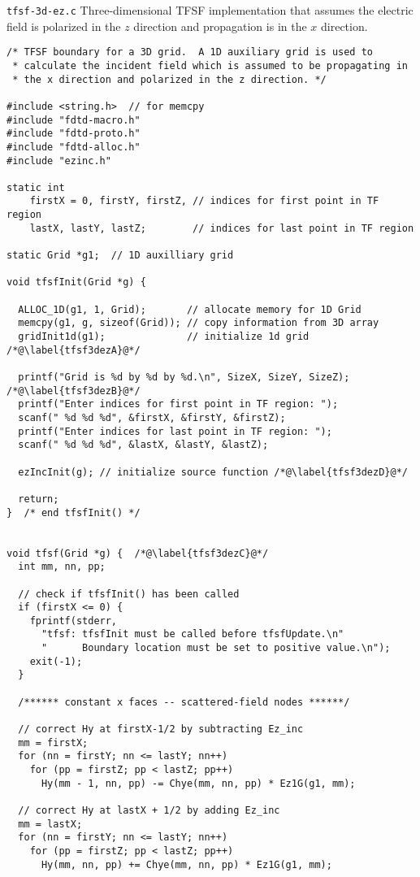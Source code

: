 \begin{program}
  {\tt tfsf-3d-ez.c} Three-dimensional TFSF implementation that
  assumes the electric field is polarized in the $z$ direction and
  propagation is in the $x$ direction.
\label{pro:3dTfsfEz}
\codemiddle
\begin{lstlisting}
/* TFSF boundary for a 3D grid.  A 1D auxiliary grid is used to
 * calculate the incident field which is assumed to be propagating in
 * the x direction and polarized in the z direction. */

#include <string.h>  // for memcpy
#include "fdtd-macro.h"
#include "fdtd-proto.h"
#include "fdtd-alloc.h"
#include "ezinc.h"

static int 
    firstX = 0, firstY, firstZ, // indices for first point in TF region
    lastX, lastY, lastZ;        // indices for last point in TF region

static Grid *g1;  // 1D auxilliary grid

void tfsfInit(Grid *g) {

  ALLOC_1D(g1, 1, Grid);       // allocate memory for 1D Grid
  memcpy(g1, g, sizeof(Grid)); // copy information from 3D array
  gridInit1d(g1);              // initialize 1d grid /*@\label{tfsf3dezA}@*/

  printf("Grid is %d by %d by %d.\n", SizeX, SizeY, SizeZ); /*@\label{tfsf3dezB}@*/
  printf("Enter indices for first point in TF region: ");
  scanf(" %d %d %d", &firstX, &firstY, &firstZ);
  printf("Enter indices for last point in TF region: ");
  scanf(" %d %d %d", &lastX, &lastY, &lastZ);

  ezIncInit(g); // initialize source function /*@\label{tfsf3dezD}@*/

  return;
}  /* end tfsfInit() */


void tfsf(Grid *g) {  /*@\label{tfsf3dezC}@*/
  int mm, nn, pp;

  // check if tfsfInit() has been called
  if (firstX <= 0) {
    fprintf(stderr,
      "tfsf: tfsfInit must be called before tfsfUpdate.\n"
      "      Boundary location must be set to positive value.\n");
    exit(-1);
  }

  /****** constant x faces -- scattered-field nodes ******/

  // correct Hy at firstX-1/2 by subtracting Ez_inc
  mm = firstX;
  for (nn = firstY; nn <= lastY; nn++)
    for (pp = firstZ; pp < lastZ; pp++)
      Hy(mm - 1, nn, pp) -= Chye(mm, nn, pp) * Ez1G(g1, mm);

  // correct Hy at lastX + 1/2 by adding Ez_inc
  mm = lastX;
  for (nn = firstY; nn <= lastY; nn++)
    for (pp = firstZ; pp < lastZ; pp++)
      Hy(mm, nn, pp) += Chye(mm, nn, pp) * Ez1G(g1, mm);


\end{lstlisting}
\end{program}
